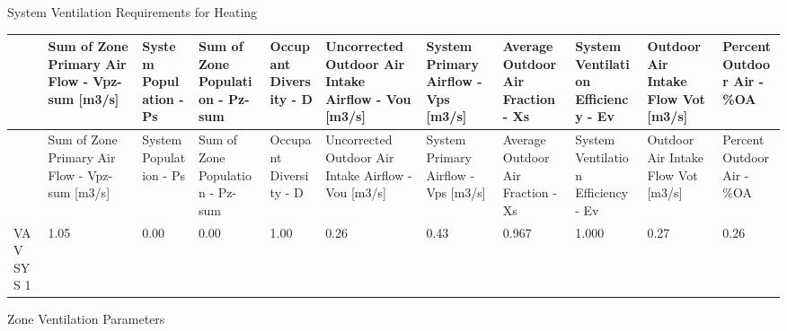 System Ventilation Requirements for Heating

{\scriptsize
\begin{longtable}[c]{>{\raggedright}p{0.54in}>{\raggedright}p{0.54in}>{\raggedright}p{0.54in}>{\raggedright}p{0.54in}>{\raggedright}p{0.54in}>{\raggedright}p{0.54in}>{\raggedright}p{0.54in}>{\raggedright}p{0.54in}>{\raggedright}p{0.54in}>{\raggedright}p{0.54in}>{\raggedright}p{0.54in}}
\toprule
 & Sum of Zone Primary Air Flow - Vpz-sum [m3/s] & System Population - Ps & Sum of Zone Population - Pz-sum & Occupant Diversity - D & Uncorrected Outdoor Air Intake Airflow - Vou [m3/s] & System Primary Airflow - Vps [m3/s] & Average Outdoor Air Fraction - Xs & System Ventilation Efficiency - Ev & Outdoor Air Intake Flow Vot [m3/s] & Percent Outdoor Air - \%OA \tabularnewline
\midrule
\endfirsthead

\toprule
 & Sum of Zone Primary Air Flow - Vpz-sum [m3/s] & System Population - Ps & Sum of Zone Population - Pz-sum & Occupant Diversity - D & Uncorrected Outdoor Air Intake Airflow - Vou [m3/s] & System Primary Airflow - Vps [m3/s] & Average Outdoor Air Fraction - Xs & System Ventilation Efficiency - Ev & Outdoor Air Intake Flow Vot [m3/s] & Percent Outdoor Air - \%OA \tabularnewline
\midrule
\endhead

VAV SYS 1 & 1.05 & 0.00 & 0.00 & 1.00 & 0.26 & 0.43 & 0.967 & 1.000 & 0.27 & 0.26 \tabularnewline
\bottomrule
\end{longtable}}

Zone Ventilation Parameters

